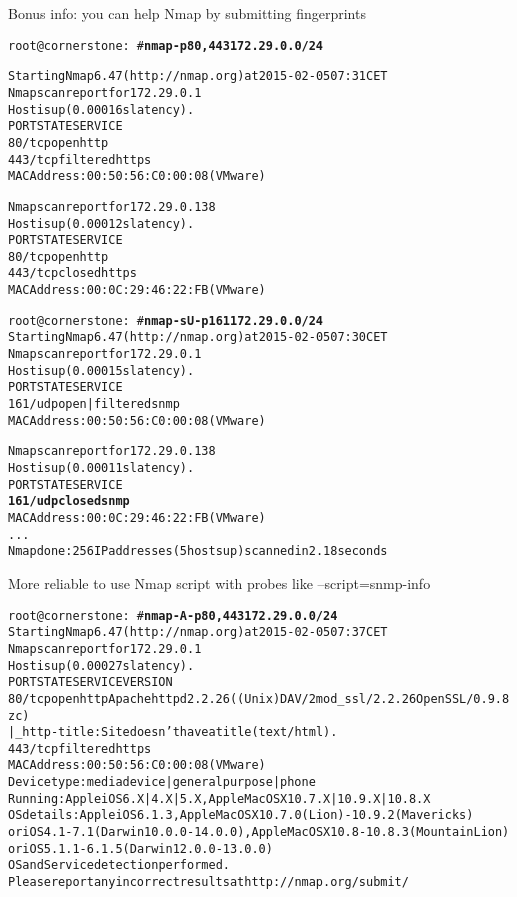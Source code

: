 \documentclass[Screen16to9,17pt]{foils}
\begin{document}
Bonus info: you can help Nmap by submitting fingerprints



\begin{alltt}\small
root@cornerstone:~#{\bfseries  nmap -p80,443 172.29.0.0/24}

Starting Nmap 6.47 ( http://nmap.org ) at 2015-02-05 07:31 CET
Nmap scan report for 172.29.0.1
Host is up (0.00016s latency).
PORT    STATE    SERVICE
{\color{darkgreen}80/tcp  open     http}
443/tcp filtered https
MAC Address: 00:50:56:C0:00:08 (VMware)

Nmap scan report for 172.29.0.138
Host is up (0.00012s latency).
PORT    STATE  SERVICE
{\color{darkgreen}80/tcp  open   http}
443/tcp closed https
MAC Address: 00:0C:29:46:22:FB (VMware)

\end{alltt}


\begin{alltt}\small
root@cornerstone:~#{\bfseries nmap -sU -p 161 172.29.0.0/24}
Starting Nmap 6.47 ( http://nmap.org ) at 2015-02-05 07:30 CET
Nmap scan report for 172.29.0.1
Host is up (0.00015s latency).
PORT    STATE         SERVICE
{\color{darkgreen}161/udp open|filtered snmp}
MAC Address: 00:50:56:C0:00:08 (VMware)

Nmap scan report for 172.29.0.138
Host is up (0.00011s latency).
PORT    STATE  SERVICE
{\bf{161/udp closed snmp}}
MAC Address: 00:0C:29:46:22:FB (VMware)
...
Nmap done: 256 IP addresses (5 hosts up) scanned in 2.18 seconds
\end{alltt}

\vskip 5mm
\centerline{More reliable to use Nmap script with probes like --script=snmp-info}

\begin{alltt}\footnotesize
root@cornerstone:~#{\bfseries nmap -A -p80,443 172.29.0.0/24}
Starting Nmap 6.47 ( http://nmap.org ) at 2015-02-05 07:37 CET
Nmap scan report for 172.29.0.1
Host is up (0.00027s latency).
PORT    STATE    SERVICE VERSION
80/tcp  open     http    Apache httpd 2.2.26 ((Unix) DAV/2 mod_ssl/2.2.26 OpenSSL/0.9.8zc)
|_http-title: Site doesn't have a title (text/html).
443/tcp filtered https
MAC Address: 00:50:56:C0:00:08 (VMware)
Device type: media device|general purpose|phone
Running: Apple iOS 6.X|4.X|5.X, Apple Mac OS X 10.7.X|10.9.X|10.8.X
OS details: Apple iOS 6.1.3, Apple Mac OS X 10.7.0 (Lion) - 10.9.2 (Mavericks)
or iOS 4.1 - 7.1 (Darwin 10.0.0 - 14.0.0), Apple Mac OS X 10.8 - 10.8.3 (Mountain Lion)
or iOS 5.1.1 - 6.1.5 (Darwin 12.0.0 - 13.0.0)
OS and Service detection performed.
Please report any incorrect results at http://nmap.org/submit/
\end{alltt}
\end{document}
